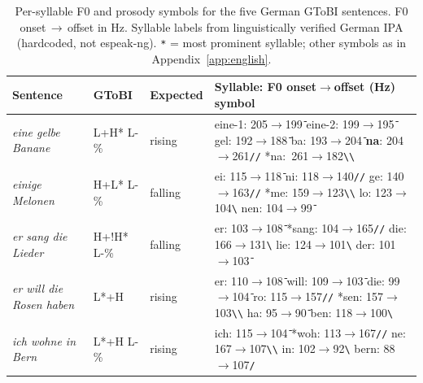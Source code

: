 \begin{table}[h]
\centering
\caption{Per-syllable F0 and prosody symbols for the five German GToBI sentences.
F0 onset\,$\to$\,offset in Hz. Syllable labels from linguistically verified
German IPA (hardcoded, not espeak-ng).
\texttt{*} = most prominent syllable; other symbols as in
Appendix~\ref{app:english}.}
\label{tab:german}
\small
\setlength{\tabcolsep}{5pt}
\begin{tabular}{p{3.6cm} l l p{6.4cm}}
\toprule
Sentence & GToBI & Expected & Syllable: F0 onset$\to$offset (Hz) \quad symbol \\
\midrule
\textit{eine gelbe Banane}
  & L+H* L-\%
  & rising
  & eine-1: 205$\to$199\;\texttt{{\={}}} \quad
    eine-2: 199$\to$195\;\texttt{{\={}}} \quad
    gel: 192$\to$188\;\texttt{{\={}}} \quad
    ba: 193$\to$204\;\texttt{{\={}}} \quad
    \textbf{na}: 204$\to$261\;\texttt{//} \quad
    *na:\ 261$\to$182\;\texttt{\textbackslash\textbackslash} \\
\addlinespace[4pt]
\textit{einige Melonen}
  & H+L* L-\%
  & falling
  & ei: 115$\to$118\;\texttt{{\={}}} \quad
    ni: 118$\to$140\;\texttt{//} \quad
    ge: 140$\to$163\;\texttt{//} \quad
    *me: 159$\to$123\;\texttt{\textbackslash\textbackslash} \quad
    lo: 123$\to$104\;\texttt{\textbackslash} \quad
    nen: 104$\to$99\;\texttt{{\={}}} \\
\addlinespace[4pt]
\textit{er sang die Lieder}
  & H+!H* L-\%
  & falling
  & er: 103$\to$108\;\texttt{{\={}}} \quad
    *sang: 104$\to$165\;\texttt{//} \quad
    die: 166$\to$131\;\texttt{\textbackslash} \quad
    lie: 124$\to$101\;\texttt{\textbackslash} \quad
    der: 101$\to$103\;\texttt{{\={}}} \\
\addlinespace[4pt]
\textit{er will die Rosen haben}
  & L*+H
  & rising
  & er: 110$\to$108\;\texttt{{\={}}} \quad
    will: 109$\to$103\;\texttt{{\={}}} \quad
    die: 99$\to$104\;\texttt{{\={}}} \quad
    ro: 115$\to$157\;\texttt{//} \quad
    *sen: 157$\to$103\;\texttt{\textbackslash\textbackslash} \quad
    ha: 95$\to$90\;\texttt{{\={}}} \quad
    ben: 118$\to$100\;\texttt{\textbackslash} \\
\addlinespace[4pt]
\textit{ich wohne in Bern}
  & L*+H L-\%
  & rising
  & ich: 115$\to$104\;\texttt{{\={}}} \quad
    *woh: 113$\to$167\;\texttt{//} \quad
    ne: 167$\to$107\;\texttt{\textbackslash\textbackslash} \quad
    in: 102$\to$92\;\texttt{\textbackslash} \quad
    bern: 88$\to$107\;\texttt{/} \\
\bottomrule
\end{tabular}
\end{table}

